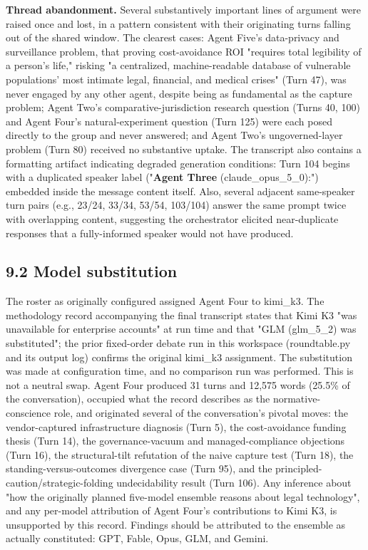 \documentclass[sigconf,nonacm=true]{acmart}
\begin{document}
\textbf{Thread abandonment.} Several substantively important lines of argument were raised once and lost, in a pattern consistent with their originating turns falling out of the shared window. The clearest cases: Agent Five's data-privacy and surveillance problem,  that proving cost-avoidance ROI "requires total legibility of a person's life," risking "a centralized, machine-readable database of vulnerable populations' most intimate legal, financial, and medical crises" (Turn 47),  was never engaged by any other agent, despite being as fundamental as the capture problem; Agent Two's comparative-jurisdiction research question (Turns 40, 100) and Agent Four's natural-experiment question (Turn 125) were each posed directly to the group and never answered; and Agent Two's ungoverned-layer problem (Turn 80) received no substantive uptake. The transcript also contains a formatting artifact indicating degraded generation conditions: Turn 104 begins with a duplicated speaker label ("\textbf{Agent Three} (claude\_opus\_5\_0):") embedded inside the message content itself. Also, several adjacent same-speaker turn pairs (e.g., 23/24, 33/34, 53/54, 103/104) answer the same prompt twice with overlapping content, suggesting the orchestrator elicited near-duplicate responses that a fully-informed speaker would not have produced.

\subsection{9.2 Model substitution}

The roster as originally configured assigned Agent Four to kimi\_k3. The methodology record accompanying the final transcript states that Kimi K3 "was unavailable for enterprise accounts" at run time and that "GLM (glm\_5\_2) was substituted"; the prior fixed-order debate run in this workspace (roundtable.py and its output log) confirms the original kimi\_k3 assignment. The substitution was made at configuration time, and no comparison run was performed. This is not a neutral swap. Agent Four produced 31 turns and 12,575 words (25.5\% of the conversation), occupied what the record describes as the normative-conscience role, and originated several of the conversation's pivotal moves: the vendor-captured infrastructure diagnosis (Turn 5), the cost-avoidance funding thesis (Turn 14), the governance-vacuum and managed-compliance objections (Turn 16), the structural-tilt refutation of the naive capture test (Turn 18), the standing-versus-outcomes divergence case (Turn 95), and the principled-caution/strategic-folding undecidability result (Turn 106). Any inference about "how the originally planned five-model ensemble reasons about legal technology",  and any per-model attribution of Agent Four's contributions to Kimi K3,  is unsupported by this record. Findings should be attributed to the ensemble as actually constituted: GPT, Fable, Opus, GLM, and Gemini.
\end{document}
